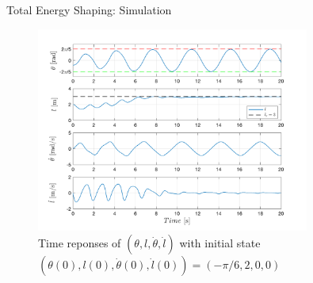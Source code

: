 \documentclass[10pt]{beamer}
\begin{document}
  \begin{frame}{Total Energy Shaping: Simulation}
    \begin{figure}
      \caption*{Time reponses of $(\theta,l,\dot{\theta},\dot{l})$ with initial
        state $(\theta(0),l(0),\dot{\theta}(0),\dot{l}(0))=(-\pi/6,2,0,0)$}
      \vspace{-0.3cm}
      \includegraphics[width=0.8\textwidth]{images/total_2b.pdf}
    \end{figure}
  \end{frame}
\end{document}

